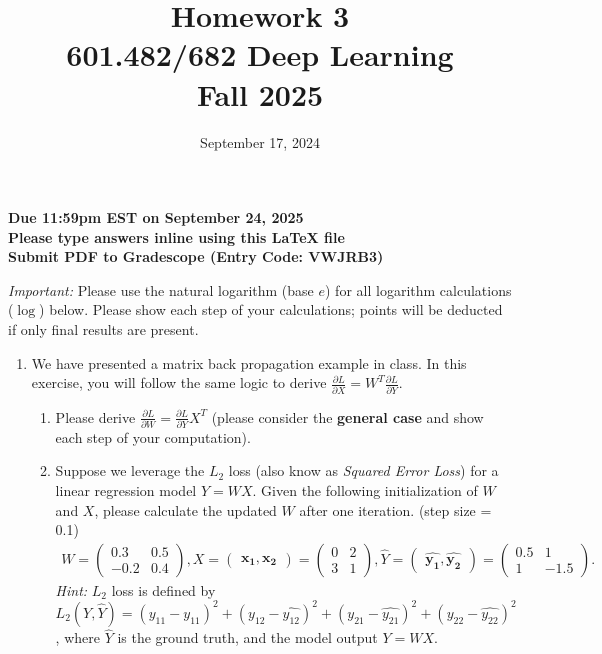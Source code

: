 \documentclass[a4paper]{article}
\date{September 17, 2024}
\title{Homework 3\\
	601.482/682 Deep Learning\\
    Fall 2025}
\begin{document}
\maketitle

\begin{center}
	\textbf{Due 11:59pm EST on September 24, 2025 \\
		    Please type answers inline using this LaTeX file\\
			Submit PDF to Gradescope (Entry Code: VWJRB3)}
\end{center}

\noindent \textit{Important:} Please use the natural logarithm (base $e$) for all logarithm calculations ($\log$) below. Please show each step of your calculations; points will be deducted if only final results are present.

\begin{enumerate}
	\item We have presented a matrix back propagation example in class. In this exercise, you will follow the same logic to derive $\frac{\partial L}{\partial X} = W^T\frac{\partial L}{\partial Y}$. 
	\begin{enumerate}
		\item Please derive $\frac{\partial L}{\partial W}=\frac{\partial L}{\partial Y}X^T$ (please consider the \textbf{general case} and show each step of your computation).
		\item Suppose we leverage the $L_2$ loss (also know as \textit{Squared Error Loss}) for a linear regression model $Y=WX$. Given the following initialization of $W$ and $X$, please calculate the updated $W$ after one iteration. (step size = 0.1)
		\begin{align*}
		W = \begin{pmatrix}
		0.3 & 0.5\\
		-0.2 & 0.4
		\end{pmatrix},
		X = \begin{pmatrix}
		\mathbf{x_1}, \mathbf{x_2}
		\end{pmatrix} =
		\begin{pmatrix}
		0 & 2\\
		3 & 1
		\end{pmatrix},
		\hat{Y} = \begin{pmatrix}
		\mathbf{\hat{y_1}}, \mathbf{\hat{y_2}}
		\end{pmatrix} = 
		\begin{pmatrix}
		0.5 & 1\\
		1 & -1.5
		\end{pmatrix}.
		\end{align*}
		\textit{Hint:} $L_2$ loss is defined by $L_2(Y, \hat{Y})=(y_{11}-\hat{y_{11}})^2+(y_{12}-\hat{y_{12}})^2+(y_{21}-\hat{y_{21}})^2+(y_{22}-\hat{y_{22}})^2$, where $\hat{Y}$ is the ground truth, and the model output $Y=WX$.
	\end{enumerate}


\end{enumerate}
\end{document}
